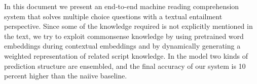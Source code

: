 In this document we present an end-to-end machine reading comprehension system that solves multiple choice questions with a textual entailment perspective. Since some of the knowledge required is not explicitly mentioned in the text, we try to exploit commonsense knowledge by using pretrained word embeddings during contextual embeddings and by dynamically generating a weighted representation of related script knowledge. In the model two kinds of prediction structure are ensembled, and the final accuracy of our system is 10 percent higher than the naiive baseline.
